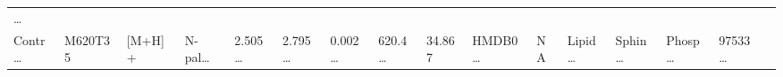 \documentclass[
]{article}
\begin{document}
\begin{longtable}[]{@{}llllllllllllllll@{}}
\begin{minipage}[t]{0.02\columnwidth}
\ldots{}\strut
\end{minipage}\tabularnewline
\begin{minipage}[t]{0.04\columnwidth}\raggedright
Contr\ldots{}\strut
\end{minipage} & \begin{minipage}[t]{0.04\columnwidth}\raggedright
M620T35\strut
\end{minipage} & \begin{minipage}[t]{0.04\columnwidth}\raggedright
{[}M+H{]}+\strut
\end{minipage} & \begin{minipage}[t]{0.04\columnwidth}\raggedright
N-pal\ldots{}\strut
\end{minipage} & \begin{minipage}[t]{0.04\columnwidth}\raggedright
2.505\ldots{}\strut
\end{minipage} & \begin{minipage}[t]{0.04\columnwidth}\raggedright
2.795\ldots{}\strut
\end{minipage} & \begin{minipage}[t]{0.04\columnwidth}\raggedright
0.002\ldots{}\strut
\end{minipage} & \begin{minipage}[t]{0.04\columnwidth}\raggedright
620.4\ldots{}\strut
\end{minipage} & \begin{minipage}[t]{0.04\columnwidth}\raggedright
34.867\strut
\end{minipage} & \begin{minipage}[t]{0.04\columnwidth}\raggedright
HMDB0\ldots{}\strut
\end{minipage} & \begin{minipage}[t]{0.03\columnwidth}\raggedright
NA\strut
\end{minipage} & \begin{minipage}[t]{0.04\columnwidth}\raggedright
Lipid\ldots{}\strut
\end{minipage} & \begin{minipage}[t]{0.04\columnwidth}\raggedright
Sphin\ldots{}\strut
\end{minipage} & \begin{minipage}[t]{0.04\columnwidth}\raggedright
Phosp\ldots{}\strut
\end{minipage} & \begin{minipage}[t]{0.04\columnwidth}\raggedright
97533\ldots{}\strut
\end{minipage} & \begin{minipage}[t]{0.02\columnwidth}\raggedright

\end{minipage}
\end{longtable}
\end{document}
